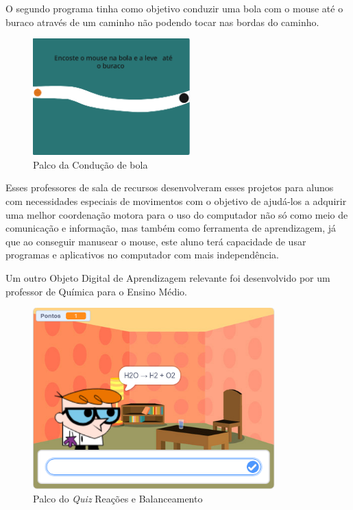 \documentclass[12pt, openright, a4paper, brazil, english, french, spanish, bibjustif, openany, oneside]{abntex2}
\begin{document}
O segundo programa tinha como objetivo conduzir uma bola com o mouse até o buraco através de um caminho não podendo tocar nas bordas do caminho.


\begin{figure}[H]

 \centering
 
         \caption{Palco da Condução de bola \label{palcorec2}}
     
         \includegraphics[height=4.5cm]{palcorec22.png}
        
 
    
\end{figure}

Esses professores de sala de recursos desenvolveram esses projetos para alunos com necessidades especiais de movimentos com o objetivo de ajudá-los a adquirir uma melhor coordenação motora para o uso do computador não só como meio de comunicação e informação, mas também como ferramenta de aprendizagem, já que ao conseguir manusear o mouse, este aluno terá capacidade de usar programas e aplicativos no computador com mais independência.

Um outro Objeto Digital de Aprendizagem relevante foi desenvolvido por um professor de Química para o Ensino Médio. 


\begin{figure}[H]

 \centering
 
         \caption{Palco do \textit{Quiz} Reações e Balanceamento \label{quiz}}
     
         \includegraphics[height=7cm]{quimicatela.png}
        
 
    
\end{figure}
\end{document}

